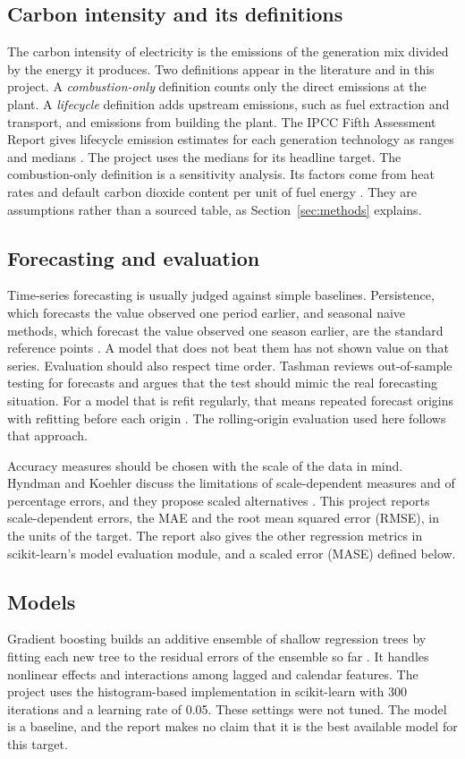 \documentclass[10pt,journal,compsoc]{IEEEtran}
\begin{document}
\subsection{Carbon intensity and its definitions}
The carbon intensity of electricity is the emissions of the generation mix divided by the energy it produces. Two definitions appear in the literature and in this project. A \emph{combustion-only} definition counts only the direct emissions at the plant. A \emph{lifecycle} definition adds upstream emissions, such as fuel extraction and transport, and emissions from building the plant. The IPCC Fifth Assessment Report gives lifecycle emission estimates for each generation technology as ranges and medians \cite{ipcc2014}. The project uses the medians for its headline target. The combustion-only definition is a sensitivity analysis. Its factors come from heat rates and default carbon dioxide content per unit of fuel energy \cite{ipcc2006}. They are assumptions rather than a sourced table, as Section~\ref{sec:methods} explains.

\subsection{Forecasting and evaluation}
Time-series forecasting is usually judged against simple baselines. Persistence, which forecasts the value observed one period earlier, and seasonal naive methods, which forecast the value observed one season earlier, are the standard reference points \cite{hyndman2021}. A model that does not beat them has not shown value on that series. Evaluation should also respect time order. Tashman reviews out-of-sample testing for forecasts and argues that the test should mimic the real forecasting situation. For a model that is refit regularly, that means repeated forecast origins with refitting before each origin \cite{tashman2000}. The rolling-origin evaluation used here follows that approach.

Accuracy measures should be chosen with the scale of the data in mind. Hyndman and Koehler discuss the limitations of scale-dependent measures and of percentage errors, and they propose scaled alternatives \cite{hyndman2006}. This project reports scale-dependent errors, the MAE and the root mean squared error (RMSE), in the units of the target. The report also gives the other regression metrics in scikit-learn's model evaluation module, and a scaled error (MASE) defined below.

\subsection{Models}
Gradient boosting builds an additive ensemble of shallow regression trees by fitting each new tree to the residual errors of the ensemble so far \cite{friedman2001}. It handles nonlinear effects and interactions among lagged and calendar features. The project uses the histogram-based implementation in scikit-learn \cite{pedregosa2011} with 300 iterations and a learning rate of 0.05. These settings were not tuned. The model is a baseline, and the report makes no claim that it is the best available model for this target.
\end{document}

